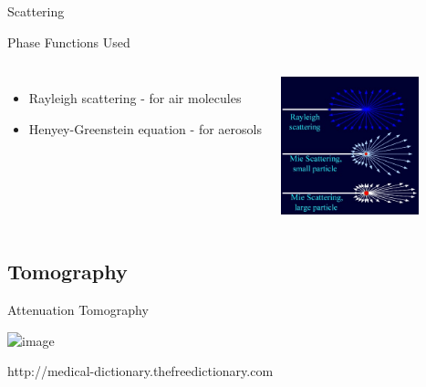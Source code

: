 \documentclass[compress,red,12pt]{beamer}
\begin{document}

\begin{frame}{Scattering}
    \begin{overprint}
      {\centerline{\def\svgwidth{0.5\linewidth}\small{}}}
      {\centerline{\def\svgwidth{0.5\linewidth}\small{}}}
      {\centerline{\def\svgwidth{0.5\linewidth}\small{}}}
    \end{overprint}
    
    \begin{center}
    \end{center}
\end{frame}


\begin{frame}[T]{Phase Functions Used}
  \begin{columns}[T]
    \begin{itemize}
    \item Rayleigh scattering - for air molecules
    \item  Henyey-Greenstein equation - for aerosols
    \end{itemize}
    \centering
    \includegraphics[height=4cm]{images/Mie_Rayleigh.jpg}
  \end{columns}
\end{frame}



\subsection{Tomography}

\begin{frame}{Attenuation Tomography}
  \begin{center}
    \includegraphics<1>[height=6cm]{images/ct.png}
  \end{center}
  
  \begin{flushright}
     {\tiny http://medical-dictionary.thefreedictionary.com}
  \end{flushright}
\end{frame}
\end{document}
